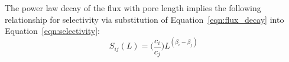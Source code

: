 \documentclass{article}
\begin{document}
%  
  


  
  The power law decay of the flux with pore length implies the following relationship
  for selectivity via substitution of Equation~\ref{eqn:flux_decay} into 
  Equation~\ref{eqn:selectivity}:
  \begin{equation}
  S_{ij}(L) = \bigg(\frac{c_i}{c_j}\bigg)L^{(\beta_i - \beta_j)}
  \label{eqn:selectivity_ratio}
  \end{equation}
  
\end{document}
